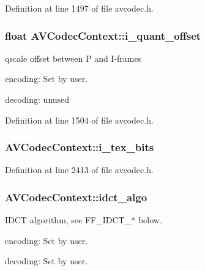 Definition at line 1497 of file avcodec.\+h.

\subsubsection[{\texorpdfstring{i\+\_\+quant\+\_\+offset}{i_quant_offset}}]{\setlength{\rightskip}{0pt plus 5cm}float A\+V\+Codec\+Context\+::i\+\_\+quant\+\_\+offset}\hypertarget{struct_a_v_codec_context_afe9b149e17b9e28823ab3cf9732b990d}{}\label{struct_a_v_codec_context_afe9b149e17b9e28823ab3cf9732b990d}
qscale offset between P and I-\/frames
\begin{DoxyItemize}
\item encoding\+: Set by user.
\item decoding\+: unused 
\end{DoxyItemize}

Definition at line 1504 of file avcodec.\+h.

\subsubsection[{\texorpdfstring{i\+\_\+tex\+\_\+bits}{i_tex_bits}}]{ A\+V\+Codec\+Context\+::i\+\_\+tex\+\_\+bits}\hypertarget{struct_a_v_codec_context_a6bc43abf810bfbc0c9a4fb17ca4b2ec1}{}\label{struct_a_v_codec_context_a6bc43abf810bfbc0c9a4fb17ca4b2ec1}


Definition at line 2413 of file avcodec.\+h.

\subsubsection[{\texorpdfstring{idct\+\_\+algo}{idct_algo}}]{ A\+V\+Codec\+Context\+::idct\+\_\+algo}\hypertarget{struct_a_v_codec_context_a8b669e043c8b064fcf991fd71e16a870}{}\label{struct_a_v_codec_context_a8b669e043c8b064fcf991fd71e16a870}
I\+D\+CT algorithm, see F\+F\+\_\+\+I\+D\+C\+T\+\_\+$\ast$ below.
\begin{DoxyItemize}
\item encoding\+: Set by user.
\item decoding\+: Set by user. 
\end{DoxyItemize}

